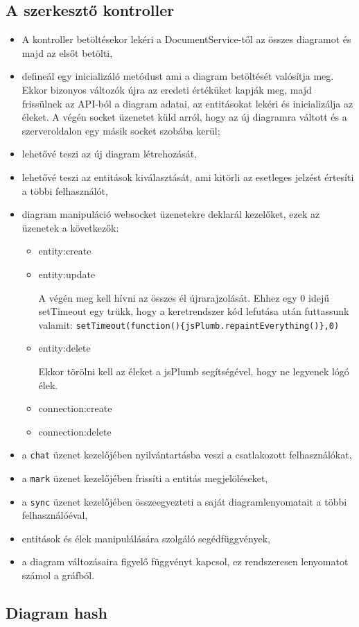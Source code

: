 \subsection{A szerkesztő kontroller}

\begin{itemize}
\item A kontroller betöltésekor lekéri a DocumentService-től az összes diagramot és majd az elsőt betölti,
\item defineál egy inicializáló metódust ami a diagram betöltését valósítja meg. Ekkor bizonyos változók újra az eredeti értéküket kapják meg, majd frissülnek az API-ból a diagram adatai, az entitásokat lekéri és inicializálja az éleket. A végén socket üzenetet küld arról, hogy az új diagramra váltott és a szerveroldalon egy másik socket szobába kerül;
\item lehetővé teszi az új diagram létrehozását,
\item lehetővé teszi az entitások kiválasztását, ami kitörli az esetleges jelzést értesíti a többi felhasználót,
\item diagram manipuláció websocket üzenetekre deklarál kezelőket, ezek az üzenetek a következők:
\begin{itemize}
\item entity:create
\item entity:update

A végén meg kell hívni az összes él újrarajzolását. Ehhez egy 0 idejű setTimeout egy trükk, hogy a keretrendszer kód lefutása után futtassunk valamit: \lstinline|setTimeout(function(){jsPlumb.repaintEverything()},0)|

\item entity:delete

Ekkor törölni kell az éleket a jsPlumb segítségével, hogy ne legyenek lógó élek.

\item connection:create
\item connection:delete

\end{itemize}

\item a \lstinline{chat} üzenet kezelőjében nyilvántartásba veszi a csatlakozott felhasználókat,
\item a \lstinline{mark} üzenet kezelőjében frissíti a entitás megjelöléseket,
\item a \lstinline{sync} üzenet kezelőjében összeegyezteti a saját diagramlenyomatait a többi felhasználóéval,
\item entitások és élek manipulálására szolgáló segédfüggvények,
\item a diagram változásaira figyelő függvényt kapcsol, ez rendszeresen lenyomatot számol a gráfból.

\end{itemize}



\label{subsec:hashref}
\subsection{Diagram hash}














